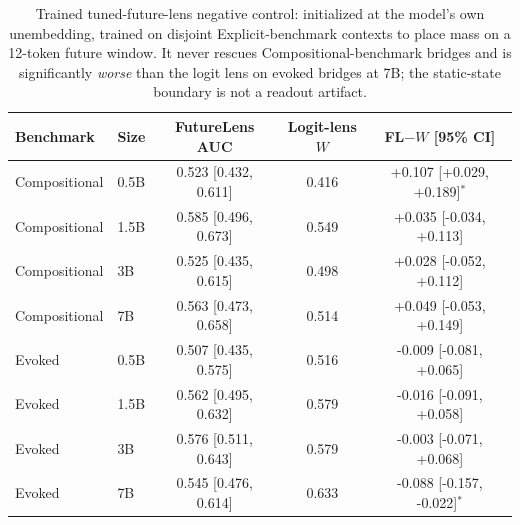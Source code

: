 \begin{table}[h]
\centering
\caption{Trained tuned-future-lens negative control: initialized at the model's own
unembedding, trained on disjoint Explicit-benchmark contexts to place mass on a 12-token future
window. It never rescues Compositional-benchmark bridges and is significantly \emph{worse}
than the logit lens on evoked bridges at 7B; the static-state boundary is not a
readout artifact.}
\label{tab:appA6}
\small
\begin{tabular}{llccc}
\toprule
Benchmark & Size & FutureLens AUC & Logit-lens $W$ & FL$-W$ [95\% CI] \\
\midrule
Compositional & 0.5B & 0.523 [0.432, 0.611] & 0.416 & +0.107 [+0.029, +0.189]$^{*}$ \\
Compositional & 1.5B & 0.585 [0.496, 0.673] & 0.549 & +0.035 [-0.034, +0.113] \\
Compositional & 3B & 0.525 [0.435, 0.615] & 0.498 & +0.028 [-0.052, +0.112] \\
Compositional & 7B & 0.563 [0.473, 0.658] & 0.514 & +0.049 [-0.053, +0.149] \\
Evoked & 0.5B & 0.507 [0.435, 0.575] & 0.516 & -0.009 [-0.081, +0.065] \\
Evoked & 1.5B & 0.562 [0.495, 0.632] & 0.579 & -0.016 [-0.091, +0.058] \\
Evoked & 3B & 0.576 [0.511, 0.643] & 0.579 & -0.003 [-0.071, +0.068] \\
Evoked & 7B & 0.545 [0.476, 0.614] & 0.633 & -0.088 [-0.157, -0.022]$^{*}$ \\
\bottomrule
\end{tabular}
\end{table}
